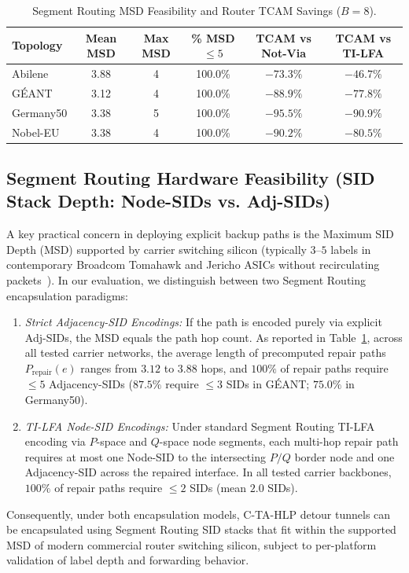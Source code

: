\documentclass[journal]{IEEEtran}
\begin{document}
\begin{table}[t]
\centering
\caption{Segment Routing MSD Feasibility and Router TCAM Savings ($B=8$).}
\label{tab:hardware_metrics}
\begin{tabular}{@{}lccccc@{}}
\toprule
\textbf{Topology} & \textbf{Mean MSD} & \textbf{Max MSD} & \textbf{\% MSD $\le 5$} & \textbf{TCAM vs Not-Via} & \textbf{TCAM vs TI-LFA} \\ \midrule
Abilene & 3.88 & 4 & 100.0\% & $-73.3\%$ & $-46.7\%$ \\
G{\'E}ANT & 3.12 & 4 & 100.0\% & $-88.9\%$ & $-77.8\%$ \\
Germany50 & 3.38 & 5 & 100.0\% & $-95.5\%$ & $-90.9\%$ \\
Nobel-EU & 3.38 & 4 & 100.0\% & $-90.2\%$ & $-80.5\%$ \\ \bottomrule
\end{tabular}
\end{table}

\subsection{Segment Routing Hardware Feasibility (SID Stack Depth: Node-SIDs vs. Adj-SIDs)}
A key practical concern in deploying explicit backup paths is the Maximum SID Depth (MSD) supported by carrier switching silicon (typically $3\text{--}5$ labels in contemporary Broadcom Tomahawk and Jericho ASICs without recirculating packets~\cite{ventre2021segment,bramas2025simple,schuller2021failure,wang2025sns}). In our evaluation, we distinguish between two Segment Routing encapsulation paradigms:
\begin{enumerate}
    \item \textit{Strict Adjacency-SID Encodings:} If the path is encoded purely via explicit Adj-SIDs, the MSD equals the path hop count. As reported in Table~\ref{tab:hardware_metrics}, across all tested carrier networks, the average length of precomputed repair paths $P_{\text{repair}}(e)$ ranges from $3.12$ to $3.88$ hops, and $100\%$ of repair paths require $\le 5$ Adjacency-SIDs ($87.5\%$ require $\le 3$ SIDs in G{\'E}ANT; $75.0\%$ in Germany50).
    \item \textit{TI-LFA Node-SID Encodings:} Under standard Segment Routing TI-LFA encoding via $P$-space and $Q$-space node segments, each multi-hop repair path requires at most one Node-SID to the intersecting $P/Q$ border node and one Adjacency-SID across the repaired interface. In all tested carrier backbones, $100\%$ of repair paths require $\le 2$ SIDs (mean $2.0$ SIDs).
\end{enumerate}
Consequently, under both encapsulation models, C-TA-HLP detour tunnels can be encapsulated using Segment Routing SID stacks that fit within the supported MSD of modern commercial router switching silicon, subject to per-platform validation of label depth and forwarding behavior.
\end{document}
